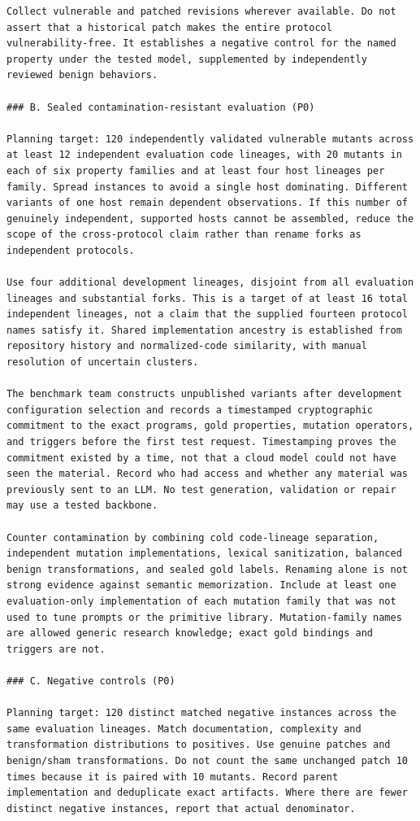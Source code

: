 \documentclass[11pt,a4paper]{article}
\begin{document}
\begin{verbatim}
Collect vulnerable and patched revisions wherever available. Do not assert that a historical patch makes the entire protocol vulnerability-free. It establishes a negative control for the named property under the tested model, supplemented by independently reviewed benign behaviors.

### B. Sealed contamination-resistant evaluation (P0)

Planning target: 120 independently validated vulnerable mutants across at least 12 independent evaluation code lineages, with 20 mutants in each of six property families and at least four host lineages per family. Spread instances to avoid a single host dominating. Different variants of one host remain dependent observations. If this number of genuinely independent, supported hosts cannot be assembled, reduce the scope of the cross-protocol claim rather than rename forks as independent protocols.

Use four additional development lineages, disjoint from all evaluation lineages and substantial forks. This is a target of at least 16 total independent lineages, not a claim that the supplied fourteen protocol names satisfy it. Shared implementation ancestry is established from repository history and normalized-code similarity, with manual resolution of uncertain clusters.

The benchmark team constructs unpublished variants after development configuration selection and records a timestamped cryptographic commitment to the exact programs, gold properties, mutation operators, and triggers before the first test request. Timestamping proves the commitment existed by a time, not that a cloud model could not have seen the material. Record who had access and whether any material was previously sent to an LLM. No test generation, validation or repair may use a tested backbone.

Counter contamination by combining cold code-lineage separation, independent mutation implementations, lexical sanitization, balanced benign transformations, and sealed gold labels. Renaming alone is not strong evidence against semantic memorization. Include at least one evaluation-only implementation of each mutation family that was not used to tune prompts or the primitive library. Mutation-family names are allowed generic research knowledge; exact gold bindings and triggers are not.

### C. Negative controls (P0)

Planning target: 120 distinct matched negative instances across the same evaluation lineages. Match documentation, complexity and transformation distributions to positives. Use genuine patches and benign/sham transformations. Do not count the same unchanged patch 10 times because it is paired with 10 mutants. Record parent implementation and deduplicate exact artifacts. Where there are fewer distinct negative instances, report that actual denominator.


\end{verbatim}
\end{document}
